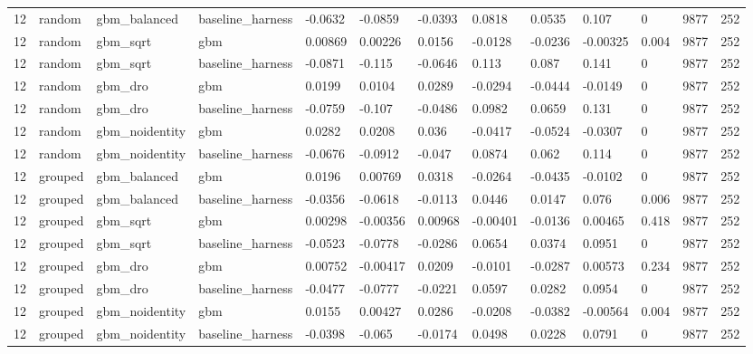 \begin{tabular}{lllllllllllll}
12 & random & gbm\_balanced & baseline\_harness & -0.0632 & -0.0859 & -0.0393 & 0.0818 & 0.0535 & 0.107 & 0 & 9877 & 252 \\
12 & random & gbm\_sqrt & gbm & 0.00869 & 0.00226 & 0.0156 & -0.0128 & -0.0236 & -0.00325 & 0.004 & 9877 & 252 \\
12 & random & gbm\_sqrt & baseline\_harness & -0.0871 & -0.115 & -0.0646 & 0.113 & 0.087 & 0.141 & 0 & 9877 & 252 \\
12 & random & gbm\_dro & gbm & 0.0199 & 0.0104 & 0.0289 & -0.0294 & -0.0444 & -0.0149 & 0 & 9877 & 252 \\
12 & random & gbm\_dro & baseline\_harness & -0.0759 & -0.107 & -0.0486 & 0.0982 & 0.0659 & 0.131 & 0 & 9877 & 252 \\
12 & random & gbm\_noidentity & gbm & 0.0282 & 0.0208 & 0.036 & -0.0417 & -0.0524 & -0.0307 & 0 & 9877 & 252 \\
12 & random & gbm\_noidentity & baseline\_harness & -0.0676 & -0.0912 & -0.047 & 0.0874 & 0.062 & 0.114 & 0 & 9877 & 252 \\
12 & grouped & gbm\_balanced & gbm & 0.0196 & 0.00769 & 0.0318 & -0.0264 & -0.0435 & -0.0102 & 0 & 9877 & 252 \\
12 & grouped & gbm\_balanced & baseline\_harness & -0.0356 & -0.0618 & -0.0113 & 0.0446 & 0.0147 & 0.076 & 0.006 & 9877 & 252 \\
12 & grouped & gbm\_sqrt & gbm & 0.00298 & -0.00356 & 0.00968 & -0.00401 & -0.0136 & 0.00465 & 0.418 & 9877 & 252 \\
12 & grouped & gbm\_sqrt & baseline\_harness & -0.0523 & -0.0778 & -0.0286 & 0.0654 & 0.0374 & 0.0951 & 0 & 9877 & 252 \\
12 & grouped & gbm\_dro & gbm & 0.00752 & -0.00417 & 0.0209 & -0.0101 & -0.0287 & 0.00573 & 0.234 & 9877 & 252 \\
12 & grouped & gbm\_dro & baseline\_harness & -0.0477 & -0.0777 & -0.0221 & 0.0597 & 0.0282 & 0.0954 & 0 & 9877 & 252 \\
12 & grouped & gbm\_noidentity & gbm & 0.0155 & 0.00427 & 0.0286 & -0.0208 & -0.0382 & -0.00564 & 0.004 & 9877 & 252 \\
12 & grouped & gbm\_noidentity & baseline\_harness & -0.0398 & -0.065 & -0.0174 & 0.0498 & 0.0228 & 0.0791 & 0 & 9877 & 252 \\
\bottomrule
\end{tabular}